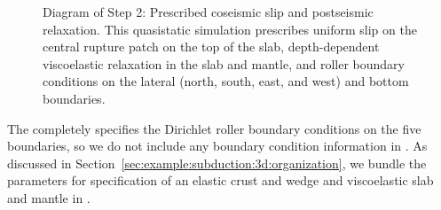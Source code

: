 \begin{figure}[htbp]
  \caption{Diagram of Step 2: Prescribed coseismic slip and
    postseismic relaxation. This quasistatic simulation prescribes
    uniform slip on the central rupture patch on the top of the slab,
    depth-dependent viscoelastic relaxation in the slab and mantle,
    and roller boundary conditions on the lateral (north, south, east,
    and west) and bottom boundaries.}
  \label{fig:example:subduction:3d:step02:diagram}
\end{figure}

The  completely specifies the Dirichlet roller
boundary conditions on the five boundaries, so we do not include any
boundary condition information in . As discussed
in Section~\vref{sec:example:subduction:3d:organization}, we bundle
the parameters for specification of an elastic crust and wedge and
viscoelastic slab and mantle in .

